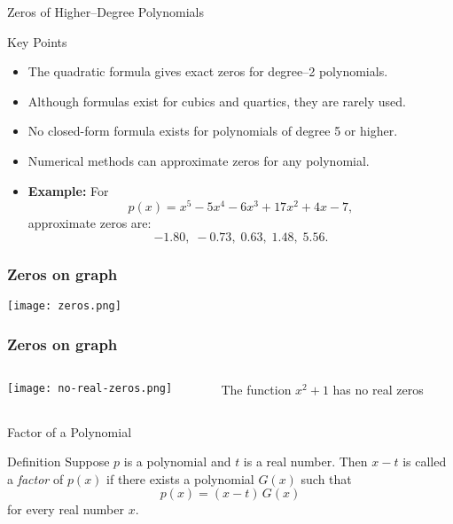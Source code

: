   \begin{frame}{Zeros of Higher–Degree Polynomials}
    \begin{block}{Key Points}
      \begin{itemize}
        \item The quadratic formula gives exact zeros for degree–2 polynomials.
        \item Although formulas exist for cubics and quartics, they are rarely used.
        \item No closed-form formula exists for polynomials of degree 5 or higher.
        \item Numerical methods can approximate zeros for any polynomial.
        \item \textbf{Example:} For 
        \[
          p(x)=x^5-5x^4-6x^3+17x^2+4x-7,
        \]
        approximate zeros are:
        \[
          -1.80,\; -0.73,\; 0.63,\; 1.48,\; 5.56.
        \]
      \end{itemize}
    \end{block}
  \end{frame}

\begin{frame}
  \frametitle{Zeros on graph}
  \centering
  \texttt{[image: zeros.png]}

\end{frame}

\begin{frame}
  \frametitle{Zeros on graph}
  \begin{columns}
    \begin{column}{0.5\textwidth}
      \centering
      \texttt{[image: no-real-zeros.png]}
    \end{column}
    \begin{column}{0.5\textwidth}
      The function \(x^{2}+1\) has no real zeros 
    \end{column}
  \end{columns}
\end{frame}

\begin{frame}{Factor of a Polynomial}
  \begin{block}{Definition}
    Suppose \(p\) is a polynomial and \(t\) is a real number. Then \(x-t\) is called a \emph{factor} of \(p(x)\) if there exists a polynomial \(G(x)\) such that
    \[
      p(x) = (x-t)\,G(x)
    \]
    for every real number \(x\).
  \end{block}
\end{frame}

